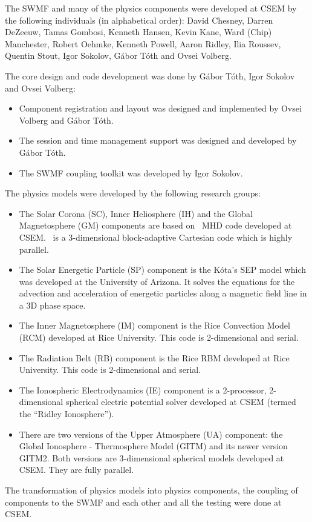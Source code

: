 The SWMF and many of the physics components were developed at CSEM
by the following individuals (in alphabetical order):
David Chesney,
Darren DeZeeuw, Tamas Gombosi, Kenneth Hansen, Kevin Kane, Ward (Chip)
Manchester, Robert Oehmke, Kenneth Powell, Aaron Ridley, Ilia Roussev,
Quentin Stout, Igor Sokolov, G\'abor T\'oth and Ovsei Volberg.

The core design and code development was done by G\'abor
T\'oth, Igor Sokolov and Ovsei Volberg:
\begin{itemize}
\item Component registration and layout was designed and implemented by 
      Ovsei Volberg and G\'abor T\'oth.
\item The session and time management support was designed and
      developed by G\'abor T\'oth.
\item The SWMF coupling toolkit was developed by Igor Sokolov.
\end{itemize}
The physics models were developed by the following research groups:
\begin{itemize}
\item
The Solar Corona (SC), Inner Heliosphere (IH) and the Global Magnetosphere 
(GM) components are based on \BATSRUS\ MHD code developed at CSEM. 
\BATSRUS\ is a 3-dimensional block-adaptive Cartesian code which is 
highly parallel.

\item
The Solar Energetic Particle (SP) component is the
K\'ota's SEP model which was developed at the University of Arizona.
It solves the equations for the advection and acceleration of
energetic particles along a magnetic field line in a 3D phase space.

\item
The Inner Magnetosphere (IM) component is the Rice Convection Model
(RCM) developed at Rice University.  This code is 2-dimensional and
serial.

\item
The Radiation Belt (RB) component is the Rice RBM
developed at Rice University.  This code is 2-dimensional and
serial.

\item
The Ionospheric Electrodynamics (IE) component is a 2-processor,
2-dimensional spherical electric potential solver developed at CSEM
(termed the ``Ridley Ionosphere'').  

\item
There are two versions of the Upper Atmosphere (UA) component:
the Global Ionosphere - Thermosphere Model (GITM) and its newer
version GITM2. Both versions are 3-dimensional spherical
models developed at CSEM.  They are fully parallel.

\end{itemize}
The transformation of physics models into physics components,
the coupling of components to the SWMF and each other and
all the testing were done at CSEM.

